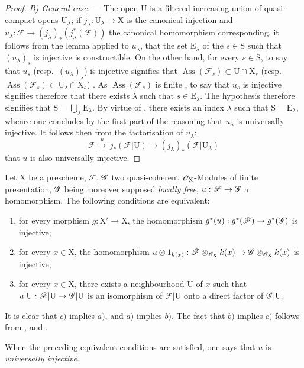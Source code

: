 \begin{proof}
\emph{B) General case.} --- The open $\mathrm{U}$ is a filtered increasing union of quasi-compact opens $\mathrm{U}_\lambda$; if $j_\lambda:\mathrm{U}_\lambda\to\mathrm{X}$ is the canonical injection and $u_\lambda:\mathscr{F}\to(j_\lambda)_*(j_\lambda^*(\mathscr{F}))$ the canonical homomorphism corresponding, it follows from the lemma  applied to $u_\lambda$, that the set $\mathrm{E}_\lambda$ of the $s\in\mathrm{S}$ such that $(u_\lambda)_s$ is injective is constructible.
On the other hand, for every $s\in\mathrm{S}$, to say that $u_s$ (resp.\ $(u_\lambda)_s$) is injective signifies that $\operatorname{Ass}(\mathscr{F}_s)\subset\mathrm{U}\cap\mathrm{X}_s$ (resp.\ $\operatorname{Ass}(\mathscr{F}_s)\subset\mathrm{U}_\lambda\cap\mathrm{X}_s$) .
As $\operatorname{Ass}(\mathscr{F}_s)$ is finite , to say that $u_s$ is injective signifies therefore that there exists $\lambda$ such that $s\in\mathrm{E}_\lambda$.
The hypothesis therefore signifies that $\mathrm{S}=\bigcup_\lambda\mathrm{E}_\lambda$.
By virtue of , there exists an index $\lambda$ such that $\mathrm{S}=\mathrm{E}_\lambda$, whence one concludes by the first part of the reasoning that $u_\lambda$ is universally injective.
It follows then from the factorisation of $u_\lambda$:
\[
  \mathscr{F}\xrightarrow{u}\,j_*(\mathscr{F}|\mathrm{U})\to(j_\lambda)_*(\mathscr{F}|\mathrm{U}_\lambda)
\]
that $u$ is also universally injective.
\end{proof}

\begin{remarks}[11.9.18]
\label{IV.11.9.18}
Let $\mathrm{X}$ be a prescheme, $\mathscr{F}$, $\mathscr{G}$ two quasi-coherent $\mathscr{O}_\mathrm{X}$-Modules of finite presentation, $\mathscr{G}$ being moreover supposed \emph{locally free}, $u:\mathscr{F}\to\mathscr{G}$ a homomorphism.
The following conditions are equivalent:
\begin{enumerate}[label=\emph{\alph*)}]
  \item for every morphism $g:\mathrm{X}'\to\mathrm{X}$, the homomorphism $g^*(u):g^*(\mathscr{F})\to g^*(\mathscr{G})$ is injective;
  \item for every $x\in\mathrm{X}$, the homomorphism $u\otimes 1_{k(x)}:\mathscr{F}\otimes_{\mathscr{O}_{\mathrm{X}}}k(x)\to\mathscr{G}\otimes_{\mathscr{O}_\mathrm{X}}k(x)$ is injective;
  \item for every $x\in\mathrm{X}$, there exists a neighbourhood $\mathrm{U}$ of $x$ such that $u|\mathrm{U}:\mathscr{F}|\mathrm{U}\to\mathscr{G}|\mathrm{U}$ is an isomorphism of $\mathscr{F}|\mathrm{U}$ onto a direct factor of $\mathscr{G}|\mathrm{U}$.
\end{enumerate}

It is clear that $c)$ implies $a)$, and $a)$ implies $b)$.
The fact that $b)$ implies $c)$ follows from ,  and .

When the preceding equivalent conditions are satisfied, one says that $u$ is \emph{universally injective}.
\end{remarks}

